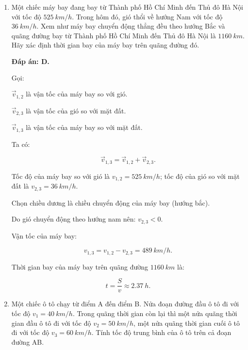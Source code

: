 \begin{enumerate}[label=\bfseries Câu \arabic*:,leftmargin=1.5cm]
	\item {}


{Một chiếc máy bay đang bay từ Thành phố Hồ Chí Minh đến Thủ đô Hà Nội với tốc độ $\SI{525}{km/h}$. Trong hôm đó, gió thổi về hướng Nam với tốc độ $\SI{36}{km/h}$. Xem như máy bay chuyển động thẳng đều theo hướng Bắc và quãng đường bay từ Thành phố Hồ Chí Minh đến Thủ đô Hà Nội là $\SI{1160}{km}$. Hãy xác định thời gian bay của máy bay trên quãng đường đó.
	
	\begin{mcq}(4)
		\item $\SI{3,27}{h}$. 
		\item $\SI{7,32}{h}$. 
		\item $\SI{1,37}{h}$. 
		\item $\SI{2,37}{h}$. 
	\end{mcq}
	
}

\hideall
{\textbf{Đáp án: D.}
	
	Gọi:
	
	$\vec v_{1,2}$ là vận tốc của máy bay so với gió.
	
	
	$\vec v_{2,3}$ là vận tốc của gió so với mặt đất.
	
	
	$\vec v_{1,3}$ là vận tốc của máy bay so với mặt đất.
	
	Ta có:
	
	$$\vec v_{1,3} = \vec v_{1,2} + \vec v_{2,3}.$$
	
	Tốc độ của máy bay so với gió là $v_{1,2}= \SI{525}{km/h}$; tốc độ của gió so với mặt đất là $ v_{2,3}= \SI{36}{km/h}$.
	
	Chọn chiều dương là chiều chuyển động của máy bay (hướng bắc).
	
	Do gió chuyển động theo hướng nam nên: $v_{2,3} <0$.
	
	Vận tốc của máy bay:
	
	$$v_{1,3} = v_{1,2} - v_{2,3} = \SI{489}{km/h}.$$
	
	Thời gian bay của máy bay trên quãng đường $\SI{1160}{km}$ là:
	
	$$ t =\dfrac{S}{v} \approx \SI{2,37}{h}.$$
}










\item {}


{Một chiếc ô tô chạy từ điểm A đến điểm B. Nửa đoạn đường đầu ô tô đi với tốc độ $v_1=\SI{40}{km/h}$. Trong quãng thời gian còn lại thì một nửa quãng thời gian đầu ô tô đi với tốc độ $v_2=\SI{50}{km/h}$, một nửa quãng thời gian cuối ô tô đi với tốc độ $v_3=\SI{60}{km/h}$. Tính tốc độ trung bình của ô tô trên cả đoạn đường AB. 
	
}
\end{enumerate}
